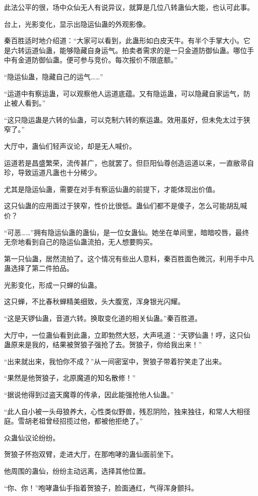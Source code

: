 \begin{this_body}
此法公平的很，场中众仙无人有说异议，就算是几位八转蛊仙大能，也认可此事。

台上，光影变化，显示出隐运仙蛊的外观影像。

秦百胜适时地介绍道：“大家可以看到，此蛊形如白皮天牛。有半个手掌大小。它是六转运道仙蛊，能够隐藏自身运气。拍卖者需求的是一只金道防御仙蛊。哪位手中有金道防御仙蛊。便可参与竞价。每次报价不限底额。”

“隐运仙蛊，隐藏自己的运气……”

“运道中有察运蛊，可以观察他人运道底蕴。又有隐运蛊，可以隐藏自家运气，防止被人看到。”

“这只隐运蛊是六转的仙蛊，可以克制六转的察运蛊。效用虽好，但未免太过于狭窄了。”

大厅中，蛊仙们轻声议论，却是无人喊价。

运道若是昌盛繁荣，流传甚广，也就罢了。但巨阳仙尊创造运道以来，一直敝帚自珍，导致运道凡蛊也十分稀少。

尤其是隐运仙蛊，需要在对手有察运仙蛊的前提下，才能体现出价值。

这只仙蛊的应用面过于狭窄，性价比很低。蛊仙们都不是傻子，怎么可能胡乱喊价？

“可恶……”拥有隐运仙蛊的蛊仙，是一位女蛊仙。她坐在单间里，暗暗咬唇，最终无奈地看到自己的隐运仙蛊流拍，无人想要购买。

第一只仙蛊，居然流拍了。这个情况有些出人意料，秦百胜面色微沉，利用手中凡蛊选择了第二件拍品。

光影变化，形成一只蝉的仙蛊。

这只蝉，不比春秋蝉精美细致，头大腹宽，浑身银光闪耀。

“这是天锣仙蛊，音道六转。换取变化道的相关仙蛊。”秦百胜道。

大厅中，一位蛊仙看到此蛊，立即勃然大怒，大声吼道：“天锣仙蛊！哼，这只仙蛊原来是我的，结果被贺狼子强抢了去。贺狼子，你给我出来！”

“出来就出来，我怕你不成？”从一间密室中，贺狼子带着狞笑走了出来。

“果然是他贺狼子，北原魔道的知名散修！”

“据说他得到过盗天魔尊的传承，因此能强抢他人仙蛊。”

“此人自小被一头母狼养大，心性类似野兽，残忍阴险，独来独往，和常人大相径庭。雪胡老祖曾经招揽过他，都被他拒绝了。”

众蛊仙议论纷纷。

贺狼子怀抱双臂，走进大厅，在那咆哮的蛊仙面前坐下。

他周围的蛊仙，纷纷主动远离，选择其他位置。

“你、你！”咆哮蛊仙手指着贺狼子，脸面通红，气得浑身颤抖。


\end{this_body}
